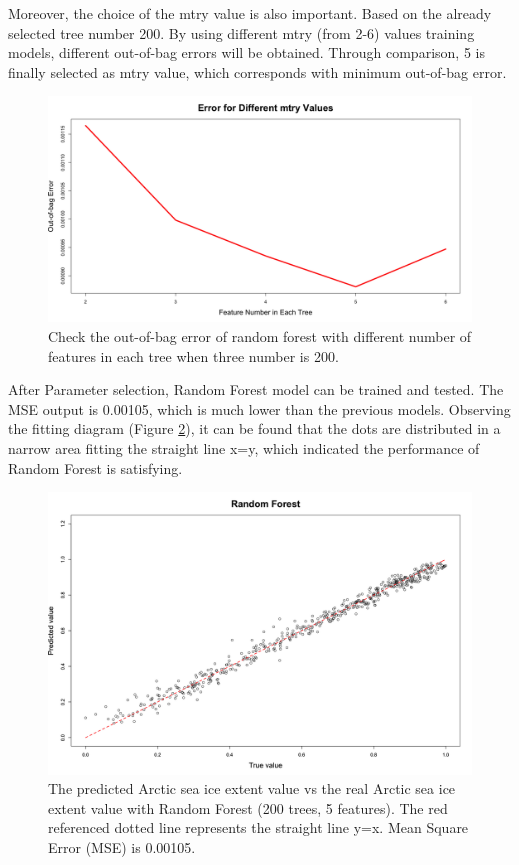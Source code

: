 Moreover, the choice of the mtry value is also important. Based on the already selected tree number 200. By using different mtry (from 2-6) values training models, different out-of-bag errors will be obtained. Through comparison, 5 is finally selected as mtry value, which corresponds with minimum out-of-bag error.

\begin{figure}[htbp]
\centering
\includegraphics[width = 1.0\textwidth]{Figure/4.2.4-RF-5Features.png}
\caption{Check the out-of-bag error of random forest with different number of features in each tree when three number is 200.}
\label{4.2.4-RF-5Features}
\end{figure}

After Parameter selection, Random Forest model can be trained and tested. The MSE output is 0.00105, which is much lower than the previous models. Observing the fitting diagram (Figure \ref{4.2.4-RF}), it can be found that the dots are distributed in a narrow area fitting the straight line x=y, which indicated the performance of Random Forest is satisfying.

\begin{figure}[htbp]
\centering
\includegraphics[width = 1.0\textwidth]{Figure/4.2.4-RF.png}
\caption{The predicted Arctic sea ice extent value vs the real Arctic sea ice extent value with Random Forest (200 trees, 5 features). The red referenced dotted line represents the straight line y=x. Mean Square Error (MSE) is 0.00105.}
\label{4.2.4-RF}
\end{figure}



